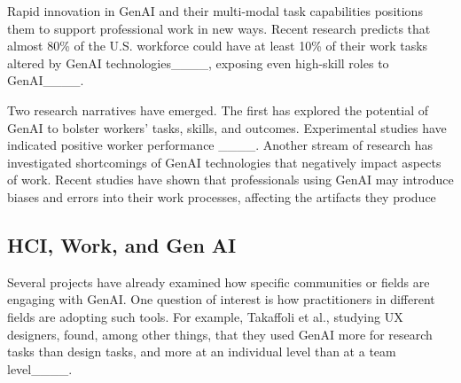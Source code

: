 

Rapid innovation in GenAI and their multi-modal task capabilities positions them to support professional work in new ways.
Recent research predicts that almost 80\% of the U.S. workforce could have at least 10\% of their work tasks altered by GenAI technologies____, exposing even high-skill roles to GenAI____.    

Two research narratives have emerged. The first has explored the potential of GenAI to bolster workers' tasks, skills, and outcomes. Experimental studies have indicated positive worker performance ____. 
Another stream of research has investigated shortcomings of GenAI technologies that negatively impact aspects of work. Recent studies have shown that professionals using GenAI may introduce biases and errors into their work processes, affecting the artifacts they produce %

\subsection{HCI, Work, and Gen AI}
Several projects have already examined how specific communities or fields are engaging with GenAI. One question of interest is how practitioners in different fields are adopting such tools.
For example, Takaffoli et al., studying UX designers, found, among other things, that they used GenAI more for research tasks than design tasks, and more at an individual level than at a team level____.


